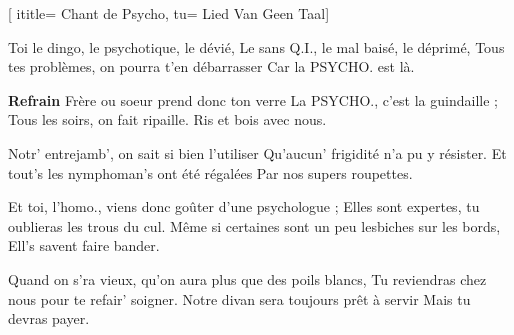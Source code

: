  [
ititle= {Chant de Psycho},
tu= {Lied Van Geen Taal}]

\beginverse
Toi le dingo, le psychotique, le dévié,
Le sans Q.I., le mal baisé, le déprimé,
Tous tes problèmes, on pourra t'en débarrasser
Car la PSYCHO. est là.
\endverse

\beginchorus
\textbf {Refrain}
Frère ou soeur prend donc ton verre
La PSYCHO., c'est la guindaille ;
Tous les soirs, on fait ripaille.
Ris et bois avec nous.
\endchorus

\beginverse
Notr' entrejamb', on sait si bien l'utiliser
Qu'aucun' frigidité n'a pu y résister.
Et tout's les nymphoman's ont été régalées
Par nos supers roupettes.
\endverse

\beginverse
Et toi, l'homo., viens donc goûter d'une psychologue ;
Elles sont expertes, tu oublieras les trous du cul.
Même si certaines sont un peu lesbiches sur les bords,
Ell's savent faire bander.
\endverse

\beginverse
Quand on s'ra vieux, qu'on aura plus que des poils blancs,
Tu reviendras chez nous pour te refair' soigner.
Notre divan sera toujours prêt à servir
Mais tu devras payer.
\endverse

\endsong
